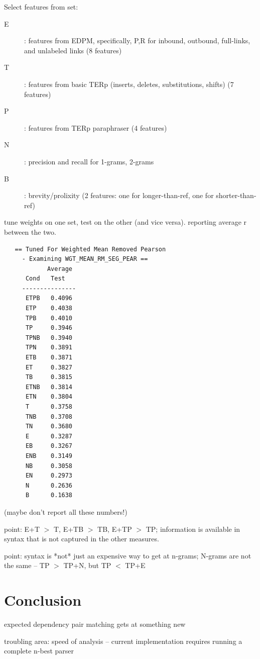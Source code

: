 \documentclass{kluwer}    %
\begin{document}
\begin{article}

Select features from set:

\begin{description}
\item[E]: features from EDPM, specifically, P,R for inbound, outbound,
  full-links, and unlabeled links  (8 features)
\item[T]: features from basic TERp
  (inserts, deletes, substitutions, shifts)  (7 features)
\item[P]: features from TERp paraphraser
  (4 features)
\item[N]: precision and recall for 1-grams, 2-grams
\item[B]: brevity/prolixity (2 features: one for longer-than-ref, one for
  shorter-than-ref)
\end{description}

tune weights on one set, test on the other (and vice versa).
reporting average r between the two.

\begin{verbatim}
   == Tuned For Weighted Mean Removed Pearson
     - Examining WGT_MEAN_RM_SEG_PEAR ==
            Average
      Cond   Test  
     ---------------
      ETPB   0.4096
      ETP    0.4038
      TPB    0.4010
      TP     0.3946
      TPNB   0.3940
      TPN    0.3891
      ETB    0.3871
      ET     0.3827
      TB     0.3815
      ETNB   0.3814
      ETN    0.3804
      T      0.3758
      TNB    0.3708
      TN     0.3680
      E      0.3287
      EB     0.3267
      ENB    0.3149
      NB     0.3058
      EN     0.2973
      N      0.2636
      B      0.1638
\end{verbatim}
(maybe don't report all these numbers!)
  
point: E+T $>$ T, E+TB $>$ TB, E+TP $>$ TP; information is available in
syntax that is not captured in the other measures.

point: syntax is *not* just an expensive way to get at n-grams;
N-grams are not the same -- TP $>$ TP+N, but TP $<$ TP+E

\section{Conclusion}
\label{sec:conclusion}
expected dependency pair matching gets at something new

troubling area: speed of analysis -- current implementation requires
running a complete n-best parser


\end{article}
\end{document}
